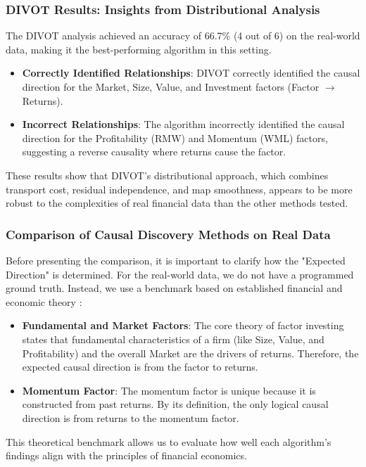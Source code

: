 \subsubsection{DIVOT Results: Insights from Distributional Analysis}
The DIVOT analysis achieved an accuracy of 66.7\% (4 out of 6) on the real-world data, making it the best-performing algorithm in this setting.

\begin{itemize}
    \item \textbf{Correctly Identified Relationships}: DIVOT correctly identified the causal direction for the Market, Size, Value, and Investment factors (Factor $\rightarrow$ Returns).
    
    \item \textbf{Incorrect Relationships}: The algorithm incorrectly identified the causal direction for the Profitability (RMW) and Momentum (WML) factors, suggesting a reverse causality where returns cause the factor.
\end{itemize}

These results show that DIVOT's distributional approach, which combines transport cost, residual independence, and map smoothness, appears to be more robust to the complexities of real financial data than the other methods tested.

\subsubsection{Comparison of Causal Discovery Methods on Real Data}
Before presenting the comparison, it is important to clarify how the "Expected Direction" is determined. For the real-world data, we do not have a programmed ground truth. Instead, we use a benchmark based on established financial and economic theory \cite{FamaFrench93, Lopez23}:
\begin{itemize}
    \item \textbf{Fundamental and Market Factors}: The core theory of factor investing states that fundamental characteristics of a firm (like Size, Value, and Profitability) and the overall Market are the drivers of returns. Therefore, the expected causal direction is from the factor to returns.
    \item \textbf{Momentum Factor}: The momentum factor is unique because it is constructed from past returns. By its definition, the only logical causal direction is from returns to the momentum factor.
\end{itemize}
This theoretical benchmark allows us to evaluate how well each algorithm's findings align with the principles of financial economics.


